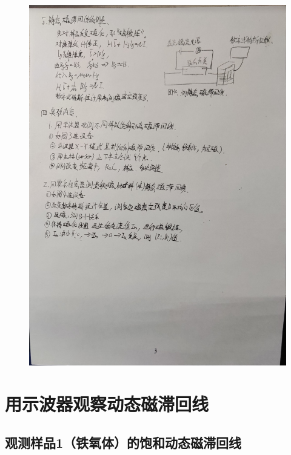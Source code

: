 \documentclass[11pt]{article}
\begin{document}
    \begin{figure}[H]
        \centering
        \includegraphics[width=16cm]{Fig/3.jpg}
    \end{figure}



\section{用示波器观察动态磁滞回线}
\subsection{观测样品1（铁氧体）的饱和动态磁滞回线}
\end{document}
